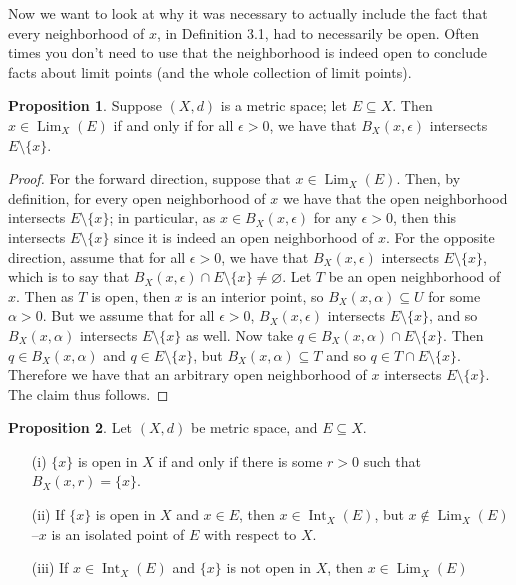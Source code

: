 \documentclass[9pt,reqno]{amsart}
\theoremstyle{definition}
\newtheorem{prop}{Proposition}[section]
\DeclareMathOperator{\Lim}{Lim}
\DeclareMathOperator{\Int}{Int}
\begin{document}
Now we want to look at why it was necessary to actually include the fact that every neighborhood of $x$, in Definition 3.1, had to necessarily be open. Often times you don't need to use that the neighborhood is indeed open to conclude facts about limit points (and the whole collection of limit points).
\begin{prop}
Suppose $(X,d )$ is a metric space; let $E \subseteq X$. Then $x \in \Lim_X(E)$ if and only if for all $\epsilon > 0$, we have that $B_X(x, \epsilon)$ intersects $E \setminus \{x \}$. 	
\end{prop}
\begin{proof}
	For the forward direction, suppose that $x \in \Lim_X(E)$. Then, by definition, for every open neighborhood of $x$ we have that the open neighborhood intersects $E \setminus \{x\}$; in particular, as $x \in B_X(x, \epsilon)$ for any $\epsilon > 0$, then this intersects $E \setminus \{x \}$ since it is indeed an open neighborhood of $x$. For the opposite direction, assume that for all $\epsilon > 0$, we have that $B_X(x, \epsilon)$ intersects $E \setminus \{x \}$, which is to say that $B_X(x, \epsilon) \cap  E \setminus \{x \} \neq \varnothing$. Let $T$ be an open neighborhood of $x$. Then as $T$ is open, then $x$ is an interior point, so $B_X(x, \alpha) \subseteq U$ for some $\alpha > 0$. But we assume that for all $\epsilon > 0$, $B_X(x, \epsilon)$ intersects $E \setminus \{ x\}$, and so $B_X(x, \alpha)$ intersects $E \setminus \{x \}$ as well. Now take $q \in B_X (x, \alpha) \cap E \setminus \{x \}$. Then $q \in B_X(x, \alpha)$ and $ q \in  E \setminus \{x \}$, but $B_X(x, \alpha) \subseteq T$ and so $q \in T \cap E \setminus \{x \}$. Therefore we have that an arbitrary open neighborhood of $x$ intersects $E \setminus \{x \}$. The claim thus follows. 
\end{proof}
\begin{prop}
Let $(X,d)$ be metric space, and $E \subseteq X$. 
\begin{itemize}
	\item[(i)] $\{x \}$ is open in $X$ if and only if there is some $r > 0$ such that $B_X(x,r) = \{ x \}$.
	\item[(ii)] If $\{x \}$ is open in $X$ and $x \in E$, then $x \in \Int_X(E)$, but $x \notin \Lim_X(E)$--$x$ is an isolated point of $E$ with respect to $X$.
	\item[(iii)] If $x \in \Int_X(E)$ and $\{x \}$ is not open in $X$, then $x \in \Lim_X(E)$
\end{itemize}
\end{prop}
\end{document}
